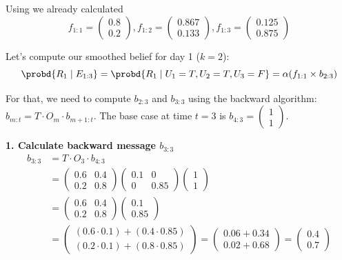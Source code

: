 Using  we already calculated 
\[
f_{1:1} = \begin{pmatrix} 0.8 \\ 0.2 \end{pmatrix}, 
f_{1:2} = \begin{pmatrix} 0.867 \\ 0.133 \end{pmatrix}, 
f_{1:3} = \begin{pmatrix} 0.125 \\ 0.875 \end{pmatrix} 
\]

Let's compute our smoothed belief for day 1 ($k=2$):
\[
\probd{R_1 \mid E_{1:3}} = \probd{R_1 \mid U_1 = T, U_2 = T, U_3 = F} = \alpha (f_{1:1} \times b_{2:3})
\]

For that, we need to compute $b_{2:3}$ and $b_{3:3}$ using the backward algorithm: $b_{m:t} = T \cdot O_m \cdot b_{m+1:t}$.
The base case at time $t=3$ is $b_{4:3} = \begin{pmatrix} 1 \\ 1 \end{pmatrix}$.

\textbf{1. Calculate backward message $b_{3:3}$}
\begin{align*}
b_{3:3} &= T \cdot O_3 \cdot b_{4:3} \\
&= \begin{pmatrix}
0.6 & 0.4 \\
0.2 & 0.8
\end{pmatrix}
\begin{pmatrix}
0.1 & 0 \\
0 & 0.85
\end{pmatrix}
\begin{pmatrix}
1 \\ 
1
\end{pmatrix} \\
&= \begin{pmatrix}
0.6 & 0.4 \\
0.2 & 0.8
\end{pmatrix}
\begin{pmatrix}
0.1 \\
0.85
\end{pmatrix} \\
&= \begin{pmatrix}
(0.6 \cdot 0.1) + (0.4 \cdot 0.85) \\
(0.2 \cdot 0.1) + (0.8 \cdot 0.85)
\end{pmatrix}
= \begin{pmatrix}
0.06 + 0.34 \\
0.02 + 0.68
\end{pmatrix}
= \begin{pmatrix}
0.4 \\
0.7
\end{pmatrix}
\end{align*}


